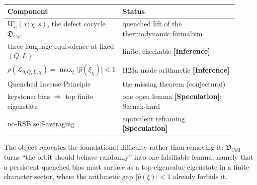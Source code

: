 \documentclass[11pt]{article}
\newcommand{\Lcal}{\mathcal{L}}
\newcommand{\Dcoll}{\mathfrak{D}_{\mathrm{Coll}}}
\newcommand{\epi}[1]{{\small\sffamily\textbf{[#1]}}}
\theoremstyle{remark}
\begin{document}
\begin{center}
\renewcommand{\arraystretch}{1.3}
\begin{tabular}{@{}p{0.40\linewidth} p{0.52\linewidth}@{}}
\toprule
\textbf{Component} & \textbf{Status}\\
\midrule
$W_n(x;\chi,s)$, the defect cocycle $\Dcoll$ & quenched lift of the thermodynamic formalism\\
three-language equivalence at fixed $(Q,L)$ & finite, checkable \epi{Inference}\\
$\rho(\Lcal_{0,Q,L,\chi}) = \max_\xi\lvert\hat p(\xi_\chi)\rvert < 1$ & \textsf{H23a} made arithmetic \epi{Inference}\\
Quenched Inverse Principle & the missing theorem (conjectural)\\
keystone: bias $\Rightarrow$ top finite eigenstate & one open lemma \epi{Speculation}; Sarnak-hard\\
no-RSB self-averaging & equivalent reframing \epi{Speculation}\\
\bottomrule
\end{tabular}
\end{center}

The object relocates the foundational difficulty rather than removing it: $\Dcoll$ turns
``the orbit should behave randomly'' into one falsifiable lemma, namely that a persistent
quenched bias must surface as a top-eigenvalue eigenstate in a finite character sector, where
the arithmetic gap $\lvert\hat p(\xi)\rvert < 1$ already forbids it.
\end{document}
